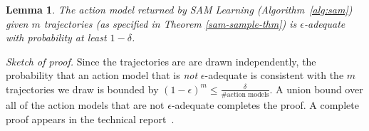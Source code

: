 \documentclass{article}
\newtheorem{lemma}{Lemma}
\newcommand{\tuple}[1]{\ensuremath{\left \langle #1 \right \rangle }}
\newcommand{\pre}{\textit{pre}}
\newcommand{\liftl}{L}
\newcommand{\lifta}{A}
\begin{document}
\begin{lemma}\label{adequate-lem}
The action model returned by SAM Learning (Algorithm~\ref{alg:sam}) 
given $m$ trajectories (as specified in Theorem \ref{sam-sample-thm})
is $\epsilon$-adequate with probability at least $1-\delta$. 
\end{lemma}
\noindent
{\em Sketch of proof.} Since the trajectories are are drawn independently, the probability that an action model that is {\em not} $\epsilon$-adequate is consistent with the $m$ trajectories we draw is bounded by $(1-\epsilon)^m\leq\frac{\delta}{\# \text{action models}}$. A union bound over all of the action models that are not $\epsilon$-adequate completes the proof. A complete proof appears in the 
technical report~\cite{juba2021arxiv}.
%
%
%
\end{document}
